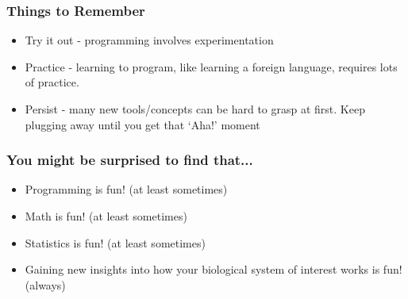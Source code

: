\documentclass{beamer}
\begin{document}
\begin{frame}
  \frametitle{Things to Remember}

\begin{itemize}

 \item Try it out - programming involves experimentation
 \item Practice - learning to program, like learning a foreign language, requires lots of practice.
 \item Persist - many new tools/concepts can be hard to grasp at first. Keep plugging away until you get that `Aha!' moment
\end{itemize}


\end{frame}


\begin{frame}
  \frametitle{You might be surprised to find that...}

\begin{itemize}

 \item Programming is fun! (at least sometimes)
 \item Math is fun! (at least sometimes)
 \item Statistics is fun! (at least sometimes)
\bigskip
 \item Gaining new insights into how your biological system of interest works is fun! (always)

\end{itemize}

\end{frame}
\end{document}

